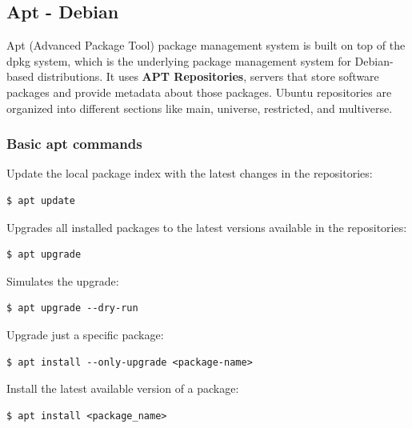 \documentclass{article}
\newenvironment{codetemplate}[1][]{%
  \mybasecolorbox[#1]
  \itshape
}{%
  \endmybasecolorbox
}
\begin{document}
\subsection{Apt - Debian}

Apt (Advanced Package Tool) package management system is built on top of the dpkg system, which is the underlying package management system for Debian-based distributions. It uses \textbf{APT Repositories}, servers that store software packages and provide metadata about those packages. Ubuntu repositories are organized into different sections like main, universe, restricted, and multiverse.

\subsubsection{Basic apt commands}

Update the local package index with the latest changes in the repositories:
\begin{codetemplate}
\begin{verbatim}
$ apt update
\end{verbatim}
\end{codetemplate}

Upgrades all installed packages to the latest versions available in the repositories:
\begin{codetemplate}
\begin{verbatim}
$ apt upgrade
\end{verbatim}
\end{codetemplate}

Simulates the upgrade:
\begin{codetemplate}
\begin{verbatim}
$ apt upgrade --dry-run
\end{verbatim}
\end{codetemplate}

Upgrade just a specific package:
\begin{codetemplate}
\begin{verbatim}
$ apt install --only-upgrade <package-name>
\end{verbatim}
\end{codetemplate}

Install the latest available version of a package:
\begin{codetemplate}
\begin{verbatim}
$ apt install <package_name>
\end{verbatim}
\end{codetemplate}
\end{document}
